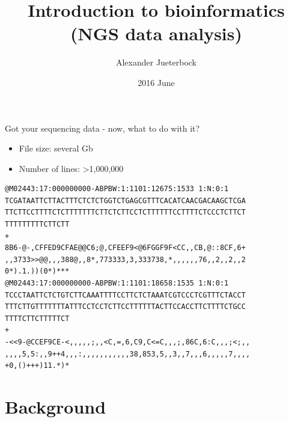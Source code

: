 \documentclass[presentation]{beamer}
\author{Alexander Jueterbock}
\date{2016 June}
\title{Introduction to bioinformatics (NGS data analysis)}
\begin{document}
\maketitle


\begin{frame}[fragile,label=sec-0-0-1]{Got your sequencing data - now, what to do with it?}
 \begin{footnotesize}
\begin{itemize}
\item File size: several Gb
\item Number of lines: >1,000,000
\end{itemize}

\begin{verbatim}
@M02443:17:000000000-ABPBW:1:1101:12675:1533 1:N:0:1
TCGATAATTCTTACTTTCTCTCTGGTCTGAGCGTTTCACATCAACGACAAGCTCGA
TTCTTCCTTTTCTCTTTTTTTCTTCTCTTCCTCTTTTTTCCTTTTCTCCCTCTTCT
TTTTTTTTTCTTCTT
+
8B6-@-,CFFED9CFAE@@C6;@,CFEEF9<@6FGGF9F<CC,,CB,@::8CF,6+
,,3733>>@@,,,388@,,8*,773333,3,333738,*,,,,,,76,,2,,2,,2
0*).1.))(0*)***
@M02443:17:000000000-ABPBW:1:1101:18658:1535 1:N:0:1
TCCCTAATTCTCTGTCTTCAAATTTTCCTTCTCTAAATCGTCCCTCGTTTCTACCT
TTTCTTGTTTTTTTATTTCCTCCTCTTCCTTTTTTACTTCCACCTTCTTTTCTGCC
TTTTCTTCTTTTTCT
+
-<<9-@CCEF9CE-<,,,,,;,,<C,=,6,C9,C<=C,,,;,86C,6:C,,,;<;,,
,,,,5,5:,,9++4,,,:,,,,,,,,,,,38,853,5,,3,,7,,,6,,,,,7,,,,
+0,()+++)11.*)*
\end{verbatim}

\end{footnotesize}
\end{frame}



\section{Background}
\label{sec-1}
\end{document}
